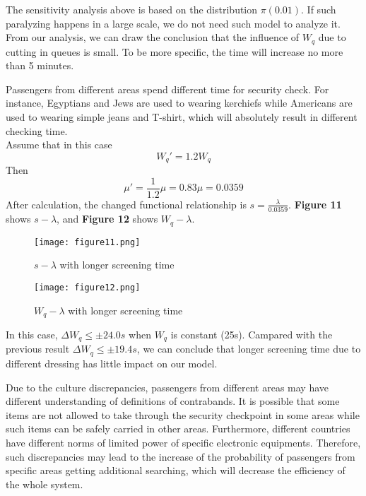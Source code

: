\documentclass{mcmthesis}
\begin{document}
	The sensitivity analysis above is based on the distribution $\pi(0.01)$. If such paralyzing happens in a large scale, we do not need such model to analyze it. From our analysis, we can draw the conclusion that the influence of $W_q$ due to cutting in queues is small. To be more specific, the time will increase no more than 5 minutes.

	Passengers from different areas spend different time for security check. For instance, Egyptians and Jews are used to wearing kerchiefs while Americans are used to wearing simple jeans and T-shirt, which will absolutely result in different checking time.\\
	Assume that in this case 
	$$W_q'=1.2W_q$$ 
	Then 
	$$\mu'=\frac{1}{1.2}\mu=0.83\mu=0.0359$$ 
	After calculation, the changed functional relationship is $s=\frac{\lambda }{0.0359}$. \textbf{Figure 11} shows $s-\lambda$, and \textbf{Figure 12} shows $W_q-\lambda$.
	\begin{figure}[H]
		\small
		\centering
		\texttt{[image: figure11.png]}
		\caption{$s-\lambda$ with longer screening time} \label{fig:11}
	\end{figure}
	\begin{figure}[h]
		\small
		\centering
		\texttt{[image: figure12.png]}
		\caption{$W_q-\lambda$ with longer screening time} \label{fig:12}
	\end{figure}
	In this case, $\Delta W_q\leq \pm 24.0s$ when $W_q$ is constant (25s). Campared with the previous result $\Delta W_q\leq \pm 19.4s$, we can conclude that longer screening time due to different dressing has little impact on our model.
	
	Due to the culture discrepancies, passengers from different areas may have different understanding of definitions of contrabands. It is possible that some items are not allowed to take through the security checkpoint in some areas while such items can be safely carried in other areas. Furthermore, different countries have different norms of limited power of specific electronic equipments. Therefore, such discrepancies may lead to the increase of the probability of passengers from specific areas getting additional searching, which will decrease the efficiency of the whole system.
	
\end{document}
